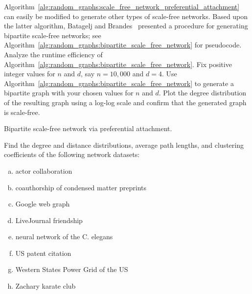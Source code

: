 \begin{problem}
\item
  Algorithm~\ref{alg:random_graphs:scale_free_network_preferential_attachment}
  can easily be modified to generate other types of scale-free
  networks. Based upon the latter algorithm,
  Batagelj and
  Brandes~\cite{BatageljBrandes2005} presented a
  procedure for generating bipartite
  scale-free networks; see
  Algorithm~\ref{alg:random_graphs:bipartite_scale_free_network} for
  pseudocode. Analyze the runtime efficiency of
  Algorithm~\ref{alg:random_graphs:bipartite_scale_free_network}. Fix
  positive integer values for $n$ and $d$, say $n = 10,000$ and
  $d = 4$. Use
  Algorithm~\ref{alg:random_graphs:bipartite_scale_free_network} to
  generate a bipartite graph with your chosen values for $n$ and
  $d$. Plot the degree distribution of the resulting graph using a
  log-log scale and confirm that the generated graph is scale-free.

\begin{algorithm}[!htbp]

\caption{Bipartite scale-free network via preferential attachment.}
\label{alg:random_graphs:bipartite_scale_free_network}
\end{algorithm}

\item Find the degree and distance distributions, average path
  lengths, and clustering coefficients of the following network
  datasets:
  \begin{enumerate}[(a)]
  \item actor collaboration~\cite{BarabasiAlbert1999}

  \item coauthorship of condensed matter preprints~\cite{Newman2001b}

  \item Google web graph~\cite{LeskovecEtAl2008}

  \item LiveJournal friendship~\cite{BackstromEtAl2006,LeskovecEtAl2008}

  \item neural network of the
    C. elegans~\cite{WattsStrogatz1998,WhiteEtAl1986}

  \item US patent citation~\cite{LeskovecEtAl2005}

  \item Western States Power Grid of the US~\cite{WattsStrogatz1998}

  \item Zachary karate club~\cite{Zachary1977}
  \end{enumerate}
\end{problem}
